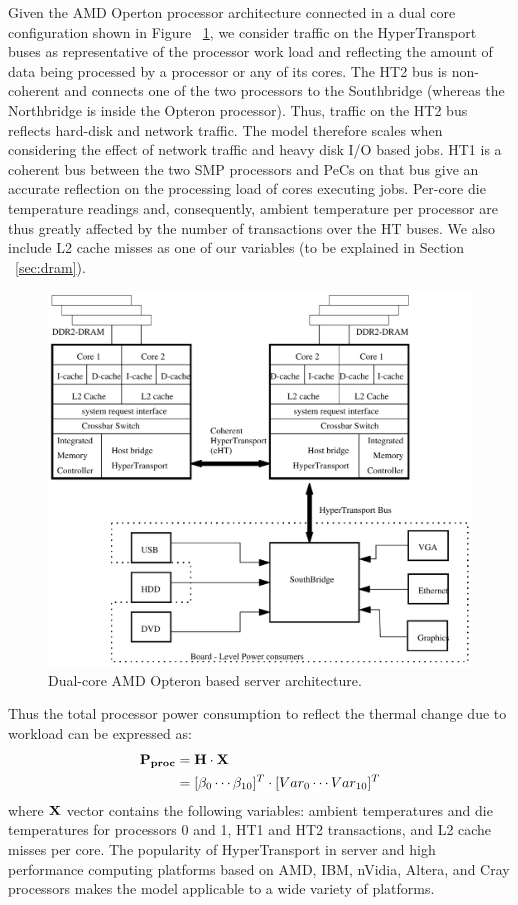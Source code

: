 \documentclass[times, 10pt, finalversion]{usetex-v1}
\begin{document}
Given the AMD Operton processor architecture connected in a dual core
configuration shown in Figure ~\ref{fig:optarch}, we consider 
traffic on the HyperTransport buses as representative of the processor work load
and reflecting the amount of data being processed by a
processor or any of its cores.  The HT2 bus is non-coherent and
connects one of the two processors to the Southbridge (whereas the Northbridge
is inside the Opteron processor). Thus, traffic on the HT2 bus reflects
hard-disk and network traffic. The model therefore scales when considering
the effect of network traffic and heavy disk I/O based jobs. HT1 is a
coherent bus between the two SMP processors and PeCs on that bus 
give an accurate reflection on the processing load of cores executing
jobs. Per-core die temperature readings and, consequently, ambient
temperature per processor are thus greatly affected by the number of
transactions over the HT buses. We also include L2 cache misses as one
of our variables (to be explained in Section ~\ref{sec:dram}).

\begin{figure}[htbp]
	\begin{center}
		\includegraphics[scale=0.4]{x2200sys.pdf}
		\caption{Dual-core AMD Opteron based server architecture.}
		\label{fig:optarch}
	\end{center}
\end{figure}
Thus the total processor power consumption to reflect the thermal change due
to workload can be expressed as:
\begin{align}
\label{eqn:procpwr}
\bf{P_{proc}}& =  \bf{H} \cdot \bf{X}\\
& = [ \beta_0 \cdots \beta_{10} ]^T \cdot [ Var_0 \cdots Var_{10} ]^T
\end{align}
where $\bf{X}$ vector contains the following variables: ambient temperatures and
die temperatures for processors 0 and 1, HT1 and HT2 transactions, and
L2 cache misses per core.  The popularity of HyperTransport in server
and high performance computing platforms based on AMD, IBM, nVidia, Altera,
and Cray processors makes the model applicable to a wide
variety of platforms.
\end{document}
